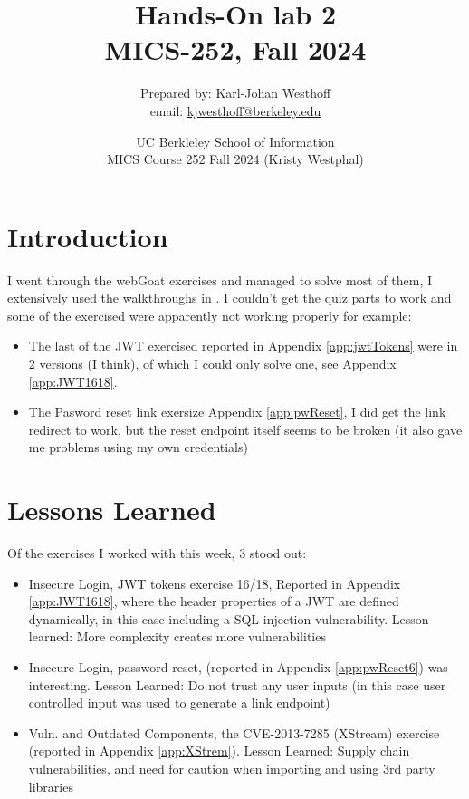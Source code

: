 \documentclass[
	letterpaper, %
	10pt, %
	unnumberedsections, %
	twoside, %
]{APAAssignment}
\title{Hands-On lab 2 \\ MICS-252, Fall 2024} %
\date{UC Berkleley School of Information \\
MICS Course 252 Fall 2024 (Kristy Westphal)
}
\author{
	Prepared by: Karl-Johan Westhoff \\
	email: \href{mailto:kjwesthoff@berkeley.edu}{kjwesthoff@berkeley.edu}
}
\begin{document}
\onecolumn
\maketitle %


\section{Introduction}
I went through the webGoat exercises and managed to solve most of them, I extensively used the walkthroughs in \cite{CycubicsDocsWebGoat}.
I couldn't get the quiz parts to work and some of the exercised were apparently not working properly for example: 
\begin{itemize}

\item{The last of the JWT exercised reported in Appendix \ref{app:jwtTokens} were in 2 versions (I think), of which I could only solve one, see Appendix \ref{app:JWT1618}}.  
\item{The Pasword reset link exersize Appendix \ref{app:pwReset}, I did get the link redirect to work, but the reset endpoint itself seems to be broken (it also gave me problems using my own credentials)} 
\end{itemize}

\section{Lessons Learned}
Of the exercises I worked with this week, 3 stood out:
\begin{itemize}
	\item{Insecure Login, JWT tokens exercise 16/18, Reported in Appendix \ref{app:JWT1618}, where the header properties of a JWT are defined dynamically, in this case including a SQL injection vulnerability. Lesson learned: More complexity creates more vulnerabilities}
	\item{Insecure Login, password reset, (reported in Appendix \ref{app:pwReset6}) was interesting. Lesson Learned: Do not trust any user inputs (in this case user controlled input was used to generate a link endpoint)}
	\item{Vuln. and Outdated Components, the CVE-2013-7285 (XStream) exercise (reported in Appendix \ref{app:XStrem}). Lesson Learned: Supply chain vulnerabilities, and need for caution when importing and using 3rd party libraries}
\end{itemize}
\end{document}
